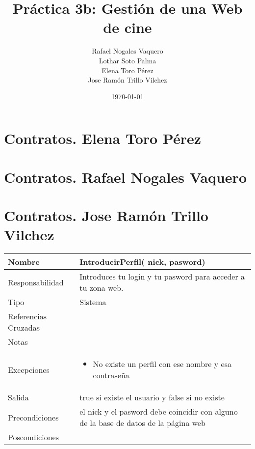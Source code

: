 \documentclass{article}
\title{Práctica 3b: Gestión de una Web de cine}
\author{Rafael Nogales Vaquero
\\Lothar Soto Palma
\\Elena Toro Pérez
\\Jose Ramón Trillo Vilchez}
\date{\today}
\begin{document}
\maketitle
\section{Contratos. Elena Toro Pérez}
\section{Contratos. Rafael Nogales Vaquero}
\section{Contratos. Jose Ramón Trillo Vilchez}

\begin{table}[h]
\begin{tabular}{|l|l|l|l|l|l|}
\hline
\multicolumn{2}{|p{3cm}|}{Nombre} & \multicolumn{4}{p{10cm}|}{\textbf{IntroducirPerfil( nick,  pasword)}}\\
\hline
\multicolumn{2}{|p{3cm}|}{Responsabilidad} & \multicolumn{4}{p{10cm}|}{Introduces tu login y tu pasword para acceder a tu zona web.} \\
\hline
\multicolumn{2}{|p{3cm}|}{Tipo} & \multicolumn{4}{p{10cm}|}{Sistema} \\
\hline
\multicolumn{2}{|p{3cm}|}{Referencias Cruzadas} & \multicolumn{4}{p{10cm}|}{} \\
\hline
\multicolumn{2}{|p{3cm}|}{Notas} & \multicolumn{4}{p{10cm}|}{} \\
\hline
\multicolumn{2}{|p{3cm}|}{Excepciones} & \multicolumn{4}{p{10cm}|}{\begin{itemize}
\item No existe un perfil con ese nombre y esa contraseña
\end{itemize}} \\
\hline
\multicolumn{2}{|p{3cm}|}{Salida} & \multicolumn{4}{p{10cm}|}{true si existe el usuario y false si no existe} \\
\hline
\multicolumn{2}{|p{3cm}|}{Precondiciones} & \multicolumn{4}{p{10cm}|}{el nick y el pasword debe coincidir con alguno de la base de datos de la página web} \\
\hline
\multicolumn{2}{|p{3cm}|}{Poscondiciones} & \multicolumn{4}{p{10cm}|}{} \\
\hline
\end{tabular}
\end{table}
\end{document}
